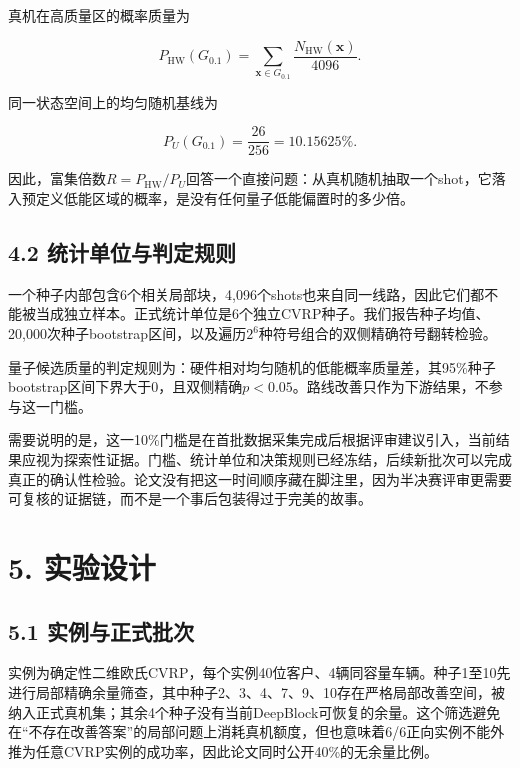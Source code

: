 \documentclass[
  10.5pt,
  UTF8]{ctexart}
\begin{document}
真机在高质量区的概率质量为

\[
P_{\mathrm{HW}}(G_{0.1})=
\sum_{\mathbf{x}\in G_{0.1}}\frac{N_{\mathrm{HW}}(\mathbf{x})}{4096}.
\]

同一状态空间上的均匀随机基线为

\[
P_U(G_{0.1})=\frac{26}{256}=10.15625\%.
\]

因此，富集倍数\(R=P_{\mathrm{HW}}/P_U\)回答一个直接问题：从真机随机抽取一个shot，它落入预定义低能区域的概率，是没有任何量子低能偏置时的多少倍。

\subsection{4.2 统计单位与判定规则}\label{ux7edfux8ba1ux5355ux4f4dux4e0eux5224ux5b9aux89c4ux5219}

一个种子内部包含6个相关局部块，4,096个shots也来自同一线路，因此它们都不能被当成独立样本。正式统计单位是6个独立CVRP种子。我们报告种子均值、20,000次种子bootstrap区间，以及遍历\(2^6\)种符号组合的双侧精确符号翻转检验。

量子候选质量的判定规则为：硬件相对均匀随机的低能概率质量差，其95\%种子bootstrap区间下界大于0，且双侧精确\(p<0.05\)。路线改善只作为下游结果，不参与这一门槛。

需要说明的是，这一10\%门槛是在首批数据采集完成后根据评审建议引入，当前结果应视为探索性证据。门槛、统计单位和决策规则已经冻结，后续新批次可以完成真正的确认性检验。论文没有把这一时间顺序藏在脚注里，因为半决赛评审更需要可复核的证据链，而不是一个事后包装得过于完美的故事。

\section{5. 实验设计}\label{ux5b9eux9a8cux8bbeux8ba1}

\subsection{5.1 实例与正式批次}\label{ux5b9eux4f8bux4e0eux6b63ux5f0fux6279ux6b21}

实例为确定性二维欧氏CVRP，每个实例40位客户、4辆同容量车辆。种子1至10先进行局部精确余量筛查，其中种子2、3、4、7、9、10存在严格局部改善空间，被纳入正式真机集；其余4个种子没有当前DeepBlock可恢复的余量。这个筛选避免在``不存在改善答案''的局部问题上消耗真机额度，但也意味着6/6正向实例不能外推为任意CVRP实例的成功率，因此论文同时公开40\%的无余量比例。
\end{document}
